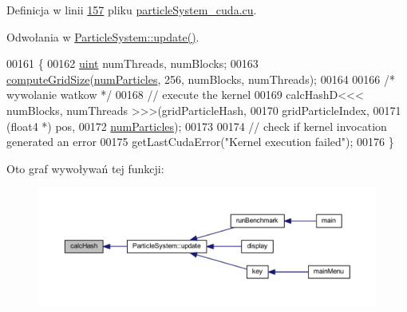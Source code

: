 Definicja w linii \hyperlink{particle_system__cuda_8cu_source_l00157}{157} pliku \hyperlink{particle_system__cuda_8cu_source}{particle\-System\-\_\-cuda.\-cu}.



Odwołania w \hyperlink{particle_system_8cpp_source_l00238}{Particle\-System\-::update()}.


\begin{DoxyCode}
00161     \{
00162         \hyperlink{particles__kernel_8cuh_a91ad9478d81a7aaf2593e8d9c3d06a14}{uint} numThreads, numBlocks;
00163         \hyperlink{particle_system__cuda_8cu_a78e8aa50e0629b57cff219a2fa753ed0}{computeGridSize}(\hyperlink{particles_8cpp_a05b8a90212054a3eb1a036ae0c269596}{numParticles}, 256, numBlocks, numThreads);
00164 
00166 \textcolor{comment}{/*      wywolanie watkow        */}
00168         \textcolor{comment}{// execute the kernel}
00169         calcHashD<<< numBlocks, numThreads >>>(gridParticleHash,
00170                                                gridParticleIndex,
00171                                                (float4 *) pos,
00172                                                \hyperlink{particles_8cpp_a05b8a90212054a3eb1a036ae0c269596}{numParticles});
00173 
00174         \textcolor{comment}{// check if kernel invocation generated an error}
00175         getLastCudaError(\textcolor{stringliteral}{"Kernel execution failed"});
00176     \}
\end{DoxyCode}


Oto graf wywoływań tej funkcji\-:\nopagebreak
\begin{figure}[H]
\begin{center}
\leavevmode
\includegraphics[width=350pt]{particle_system_8cuh_ae0a4037d25e768622443077546399cf2_icgraph}
\end{center}
\end{figure}


